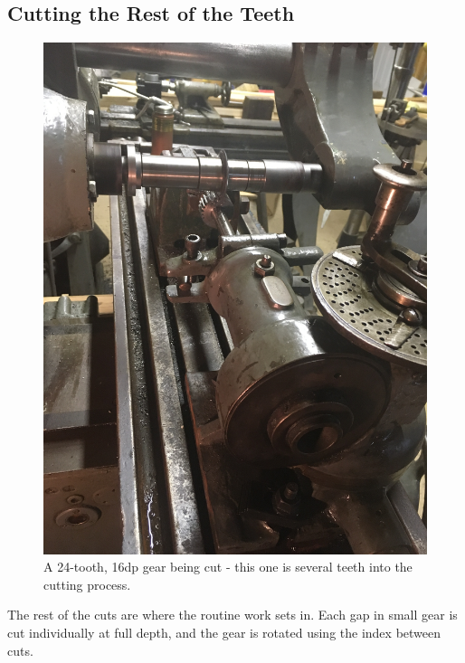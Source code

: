 \documentclass[12pt,twoside,letterpaper]{article}
\begin{document}
\subsection{Cutting the Rest of the Teeth}
\begin{figure}[H]
	\centering
		\includegraphics[width=5in]{midProcess}
	\caption{A 24-tooth, 16dp gear being cut - this one is several teeth into the cutting process.}
\end{figure}
The rest of the cuts are where the routine work sets in. Each gap in small gear is cut individually at full depth, and the gear is rotated using the index between cuts. 
\end{document}

